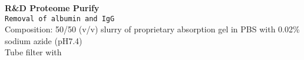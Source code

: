 \textbf{R&D Proteome Purify} 
\\
\texttt{Removal of albumin and IgG}
\\
Composition: 50/50 (v/v) slurry of proprietary absorption gel in PBS with 0.02\% sodium azide (pH7.4) \\
Tube filter with 
